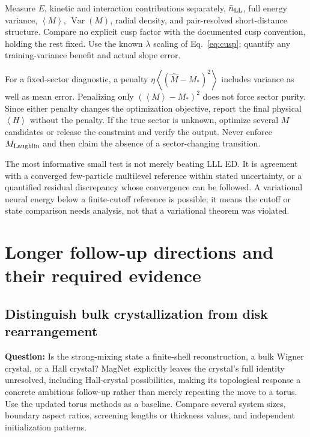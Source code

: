 \documentclass[11pt,letterpaper]{article}
\newcommand{\avg}[1]{\left\langle #1\right\rangle}
\begin{document}
Measure $E$, kinetic and interaction contributions separately, $\bar n_{\rm LL}$, full energy variance, $\avg M$, $\operatorname{Var}(M)$, radial density, and pair-resolved short-distance structure. Compare no explicit cusp factor with the documented cusp convention, holding the rest fixed. Use the known $\lambda$ scaling of Eq.~\eqref{eq:cusp}; quantify any training-variance benefit and actual slope error.

For a fixed-sector diagnostic, a penalty $\eta\avg{(\hat M-M_*)^2}$ includes variance as well as mean error. Penalizing only $(\avg M-M_*)^2$ does not force sector purity. Since either penalty changes the optimization objective, report the final physical $\avg H$ without the penalty. If the true sector is unknown, optimize several $M$ candidates or release the constraint and verify the output. Never enforce $M_{\rm Laughlin}$ and then claim the absence of a sector-changing transition.

The most informative small test is not merely beating LLL ED. It is agreement with a converged few-particle multilevel reference within stated uncertainty, or a quantified residual discrepancy whose convergence can be followed. A variational neural energy below a finite-cutoff reference is possible; it means the cutoff or state comparison needs analysis, not that a variational theorem was violated.

\section{Longer follow-up directions and their required evidence}
\label{sec:longterm}

\subsection{Distinguish bulk crystallization from disk rearrangement}

\textbf{Question:} Is the strong-mixing state a finite-shell reconstruction, a bulk Wigner crystal, or a Hall crystal? MagNet explicitly leaves the crystal's full identity unresolved, including Hall-crystal possibilities, making its topological response a concrete ambitious follow-up rather than merely repeating the move to a torus.\cite{magnet} Use the updated torus methods as a baseline. Compare several system sizes, boundary aspect ratios, screening lengths or thickness values, and independent initialization patterns.
\end{document}
